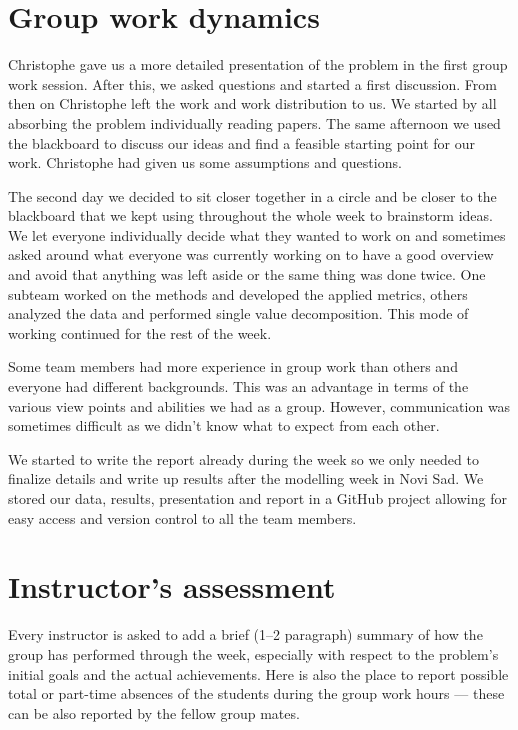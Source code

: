 \documentclass[12pt, sumlimits, intlimits]{article}
\begin{document}

\section{Group work dynamics}

Christophe gave us a more detailed presentation of the problem in the first group work session. After this, we asked questions and started a first discussion. From then on Christophe left the work and work distribution to us. We started by all absorbing the problem individually reading papers. The same afternoon we used the blackboard to discuss our ideas and find a feasible starting point for our work. Christophe had given us some assumptions and questions. 

The second day we decided to sit closer together in a circle and be closer to the blackboard that we kept using throughout the whole week to brainstorm ideas. 
We let everyone individually decide what they wanted to work on and sometimes asked around what everyone was currently working on to have a good overview and avoid that anything was left aside or the same thing was done twice. One subteam worked on the methods and developed the applied metrics, others analyzed the data and performed single value decomposition. This mode of working continued for the rest of the week. 

Some team members had more experience in group work than others and everyone had different backgrounds. This was an advantage in terms of the various view points and abilities we had as a group. However, communication was sometimes difficult as we didn't know what to expect from each other.

We started to write the report already during the week so we only needed to finalize details and write up results after the modelling week in Novi Sad. We stored our data, results, presentation and report in a GitHub project allowing for easy access and version control to all the team members. 

\section{Instructor's assessment}

Every instructor is asked to add a brief (1--2 paragraph) summary of how the
group has performed through the week, especially with respect to the problem's
initial goals and the actual achievements. Here is also the place to report
possible total or part-time absences of the students during the group work
hours --- these can be also reported by the fellow group mates.

\clearpage

\thispagestyle{empty}


\printbibliography
%  
%   
\end{document}
